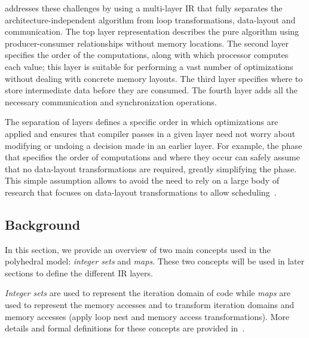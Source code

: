 \framework{} addresses these challenges by using a multi-layer IR that fully separates the architecture-independent algorithm from loop transformations, data-layout and communication.
The top layer representation describes the pure algorithm using producer-consumer relationships without memory locations.
The second layer specifies the order of the computations, along with which processor computes each value; this layer is suitable for performing a vast number of optimizations without dealing with concrete memory layouts.
The third layer specifies where to store intermediate data before they are consumed.  The fourth layer adds all the necessary communication and synchronization operations.

The separation of layers defines a specific order in which optimizations are applied and ensures that compiler passes in a given layer need not worry about modifying or undoing a decision made in an earlier layer.  For example, the phase that specifies the order of computations and where they occur can safely assume that no data-layout transformations are required, greatly simplifying the phase.
This simple assumption allows \framework{} to avoid the need to rely on a large body of research that focuses on data-layout transformations to allow scheduling~\cite{gupta1997privatization,autoPrivatPeng,li_array_1992,feautrier_array_1988,midkiff_automatic_2012,maydan_array-data_1993,lefebvre_automatic_1998,Qui00,Darte_contraction_2005}.

\subsection{Background}

In this section, we provide an overview of two main concepts used in the polyhedral model: \emph{integer sets} and \emph{maps}. These two concepts will be used in later sections to define the different IR layers.

\emph{Integer sets} are used to represent the iteration domain of code while \emph{maps} are used to represent the memory accesses and to transform iteration domains and memory accesses (apply loop nest and memory access transformations).  More details and formal definitions for these concepts are provided in~\cite{verdoolaege_isl:_2010,pencil_pact,polyhedral}.

